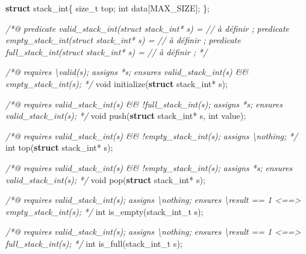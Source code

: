 \documentclass[12pt,francais,]{scrbook}
\newenvironment{Shaded}{}{}
\newcommand{\KeywordTok}[1]{\textcolor[rgb]{0.00,0.44,0.13}{\textbf{{#1}}}}
\newcommand{\DataTypeTok}[1]{\textcolor[rgb]{0.56,0.13,0.00}{{#1}}}
\newcommand{\CommentTok}[1]{\textcolor[rgb]{0.38,0.63,0.69}{\textit{{#1}}}}
\newcommand{\NormalTok}[1]{{#1}}
\begin{document}
\begin{footnotesize}\begin{Shaded}
\begin{Highlighting}[]
\KeywordTok{struct} \NormalTok{stack_int\{}
  \NormalTok{size_t top;}
  \DataTypeTok{int}    \NormalTok{data[MAX_SIZE];}
\NormalTok{\};}

\CommentTok{/*@}
\CommentTok{  predicate valid_stack_int(struct stack_int* s) = // à définir ;}
\CommentTok{  predicate empty_stack_int(struct stack_int* s) = // à définir ;}
\CommentTok{  predicate full_stack_int(struct stack_int* s) =  // à définir ;}
\CommentTok{*/}

\CommentTok{/*@}
\CommentTok{  requires \textbackslash{}valid(s);}
\CommentTok{  assigns *s;}
\CommentTok{  ensures valid_stack_int(s) && empty_stack_int(s);}
\CommentTok{*/}
\DataTypeTok{void} \NormalTok{initialize(}\KeywordTok{struct} \NormalTok{stack_int* s);}

\CommentTok{/*@}
\CommentTok{  requires valid_stack_int(s) && !full_stack_int(s);}
\CommentTok{  assigns  *s;}
\CommentTok{  ensures valid_stack_int(s);}
\CommentTok{*/}
\DataTypeTok{void} \NormalTok{push(}\KeywordTok{struct} \NormalTok{stack_int* s, }\DataTypeTok{int} \NormalTok{value);}

\CommentTok{/*@}
\CommentTok{  requires valid_stack_int(s) && !empty_stack_int(s);}
\CommentTok{  assigns \textbackslash{}nothing;}
\CommentTok{*/}
\DataTypeTok{int}  \NormalTok{top(}\KeywordTok{struct} \NormalTok{stack_int* s);}

\CommentTok{/*@}
\CommentTok{  requires valid_stack_int(s) && !empty_stack_int(s);}
\CommentTok{  assigns *s;}
\CommentTok{  ensures valid_stack_int(s);}
\CommentTok{*/}
\DataTypeTok{void} \NormalTok{pop(}\KeywordTok{struct} \NormalTok{stack_int* s);}

\CommentTok{/*@}
\CommentTok{  requires valid_stack_int(s);}
\CommentTok{  assigns \textbackslash{}nothing;}
\CommentTok{  ensures \textbackslash{}result == 1 <==> empty_stack_int(s);}
\CommentTok{*/}
\DataTypeTok{int}  \NormalTok{is_empty(stack_int_t s);}


\CommentTok{/*@}
\CommentTok{  requires valid_stack_int(s);}
\CommentTok{  assigns \textbackslash{}nothing;}
\CommentTok{  ensures \textbackslash{}result == 1 <==> full_stack_int(s);}
\CommentTok{*/}
\DataTypeTok{int}  \NormalTok{is_full(stack_int_t s);}
\end{Highlighting}
\end{Shaded}\end{footnotesize}
\end{document}

